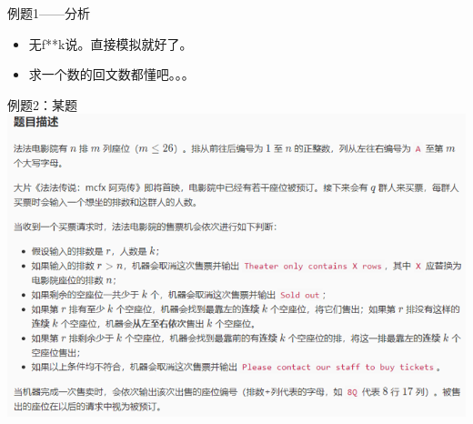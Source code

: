 \documentclass{beamer}[UTF-8]
\begin{document}
\begin{frame}{例题1——分析}
\pause
\begin{itemize}
\item 无f**k说。直接模拟就好了。  \pause
\item 求一个数的回文数都懂吧。。。
\end{itemize}
\end{frame}

\begin{frame}{例题2：某题}
\includegraphics[width=\textwidth, height=\textheight]{temp1.png}
\end{frame}
\end{document}
